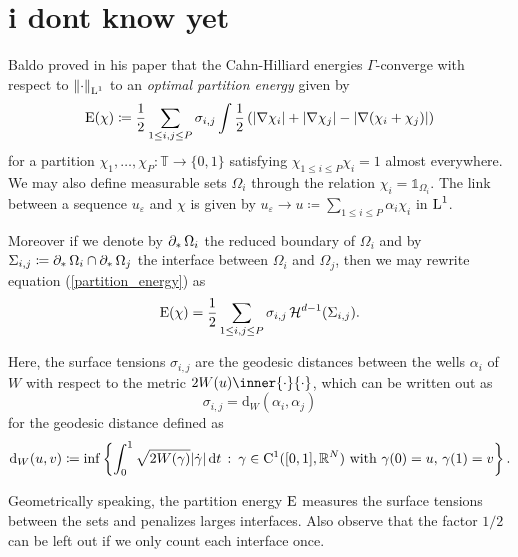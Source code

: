 \chapter{i dont know yet}

Baldo proved in his paper \cite{baldo_minimal_interface_criterion} that the Cahn-Hilliard energies $ \Gamma $-converge with respect to $ \norm{ \cdot }_{\operatorname{L}^{ 1 }} $ to an \emph{optimal partition energy} given by
\begin{equation}
	\label{partition_energy}
	\operatorname{E} ( \chi ) 
	\coloneqq
	\frac{ 1 }{ 2 }
	\sum_{ 1 \leq i, j \leq P }
	\sigma_{ i , j }
	\int
	\frac{ 1 }{ 2 }
	\left(
	\abs{ \nabla \chi_{ i } }
	+
	\abs{ \nabla \chi_{ j } }
	-
	\abs{ \nabla ( \chi_{ i } + \chi_{ j } ) }
	\right)
\end{equation}
for a partition $ \chi_{ 1 }, \dotsc, \chi_{ P } \colon \mathbb{ T } \to \{ 0, 1 \} $ satisfying $ \chi_{ 1 \leq i \leq P } \chi_{ i } = 1 $ almost everywhere. We may also define measurable sets $ \Omega_{ i } $ through the relation $ \chi_{ i } = \mathds{1}_{ \Omega_{ i } }  $. The link between a sequence $ u_{ \varepsilon} $ and $ \chi $ is given by $ u_{ \varepsilon} \to u \coloneqq \sum_{ 1 \leq i \leq P } \alpha_{ i } \chi_{ i } $ in $ \operatorname{L}^{ 1 } $. 

Moreover if we denote by $ \operatorname{\partial_{ \ast }} \Omega_{ i } $ the reduced boundary of $ \Omega_{ i } $ and by $ \Sigma_{ i , j } \coloneqq \operatorname{\partial_{ \ast }} \Omega_{ i } \cap \operatorname{\partial_{ \ast }} \Omega_{ j } $ the interface between $ \Omega_{ i } $ and $ \Omega_{ j } $, then we may rewrite equation (\ref{partition_energy}) as 
\begin{equation*}
	\operatorname{E} ( \chi ) 
	=
	\frac{ 1 }{ 2 }
	\sum_{1 \leq i, j \leq P }
	\sigma_{ i , j } \operatorname{\mathcal{H}}^{ d - 1 } ( \Sigma_{ i , j } ).
\end{equation*}

Here, the surface tensions $ \sigma_{ i , j } $ are the geodesic distances between the wells $ \alpha_{ i } $ of $ W $ with respect to the metric $ 2W(u) \inner{\cdot}{\cdot} $, which can be written out as
\begin{equation*}
	\sigma_{ i , j } = \mathrm{ d }_{ W } ( \alpha_{ i } , \alpha_{ j } )
\end{equation*}
for the geodesic distance defined as
\begin{equation}
	\mathrm{ d }_{ W } ( u, v )
	\coloneqq
	\inf
	\left\{
	\int_{ 0 }^{ 1 }
	\sqrt{ 2 W ( \gamma ) }
	\abs{ \dot{ \gamma }  }
	\dd{t}
	\,
	\colon
	\, \gamma \in \mathrm{ C }^{ 1 }( [0, 1 ], \mathbb{ R }^{ N } ) \text{ with } \gamma( 0 ) = u,\, \gamma( 1 )= v 
	\right\}.
\end{equation}

Geometrically speaking, the partition energy $ \operatorname{E} $ measures the surface tensions between the sets and penalizes larges interfaces. Also observe that the factor $ 1/2 $ can be left out if we only count each interface once.
